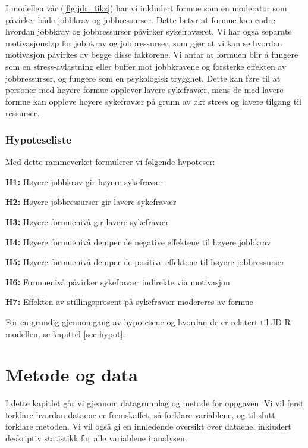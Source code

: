 \documentclass[
  12pt,
  a4paper,
  DIV=11,
  numbers=noendperiod]{scrartcl}
\begin{document}
I modellen vår (\autoref{fig:jdr_tikz}) har vi inkludert formue som en
moderator som påvirker både jobbkrav og jobbressurser. Dette betyr at
formue kan endre hvordan jobbkrav og jobbressurser påvirker
sykefraværet. Vi har også separate motivasjonsløp for jobbkrav og
jobbressurser, som gjør at vi kan se hvordan motivasjon påvirkes av
begge disse faktorene. Vi antar at formuen blir å fungere som en
stress-avlastning eller buffer mot jobbkravene og forsterke effekten av
jobbressurser, og fungere som en psykologisk trygghet. Dette kan føre
til at personer med høyere formue opplever lavere sykefravær, mens de
med lavere formue kan oppleve høyere sykefravær på grunn av økt stress
og lavere tilgang til ressurser.

\subsubsection{Hypoteseliste}\label{hypoteseliste}

Med dette rammeverket formulerer vi følgende hypoteser:

\textbf{H1:} Høyere jobbkrav gir høyere sykefravær

\textbf{H2:} Høyere jobbressurser gir lavere sykefravær

\textbf{H3:} Høyere formuenivå gir lavere sykefravær

\textbf{H4:} Høyere formuenivå demper de negative effektene til høyere
jobbkrav

\textbf{H5:} Høyere formuenivå demper de positive effektene til høyere
jobbressurser

\textbf{H6:} Formuenivå påvirker sykefravær indirekte via motivasjon

\textbf{H7:} Effekten av stillingsprosent på sykefravær modereres av
formue

For en grundig gjennomgang av hypotesene og hvordan de er relatert til
JD-R-modellen, se kapittel \ref{sec-hypot}.

\section{Metode og data}\label{metode-og-data}

I dette kapitlet går vi gjennom datagrunnlag og metode for oppgaven. Vi
vil først forklare hvordan dataene er fremskaffet, så forklare
variablene, og til slutt forklare metoden. Vi vil også gi en innledende
oversikt over dataene, inkludert deskriptiv statistikk for alle
variablene i analysen.
\end{document}
